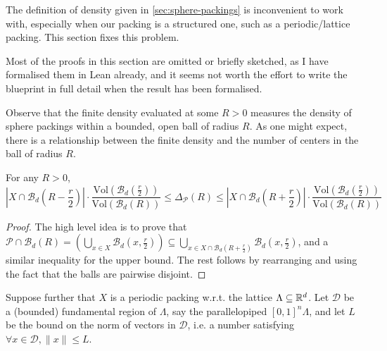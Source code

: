 The definition of density given in \cref{sec:sphere-packings} is inconvenient to work with, especially when our packing is a structured one, such as a periodic/lattice packing. This section fixes this problem.

Most of the proofs in this section are omitted or briefly sketched, as I have formalised them in Lean already, and it seems not worth the effort to write the blueprint in full detail when the result has been formalised.

Observe that the finite density evaluated at some $R > 0$ measures the density of sphere packings within a bounded, open ball of radius $R$. As one might expect, there is a relationship between the finite density and the number of centers in the ball of radius $R$.

\begin{lemma}\label{lemma:sp-finite-density-bound}\leanok
  For any $R > 0$,
  \[
    \left|X \cap \mathcal{B}_d\left(R - \frac{r}{2}\right)\right| \cdot \frac{\mathrm{Vol}\left(\mathcal{B}_d\left(\frac{r}{2}\right)\right)}{\mathrm{Vol}(\mathcal{B}_d(R))}
    \leq \Delta_{\mathcal{P}}(R)
    \leq \left|X \cap \mathcal{B}_d\left(R + \frac{r}{2}\right)\right| \cdot \frac{\mathrm{Vol}\left(\mathcal{B}_d\left(\frac{r}{2}\right)\right)}{\mathrm{Vol}(\mathcal{B}_d(R))}
  \]
\end{lemma}
\begin{proof}\leanok
  The high level idea is to prove that $\mathcal{P} \cap \mathcal{B}_d(R) = \left(\bigcup_{x \in X} \mathcal{B}_d\left(x, \frac{r}{2}\right)\right) \subseteq \bigcup_{x \in X \cap \mathcal{B}_d\left(R + \frac{r}{2}\right)} \mathcal{B}_d\left(x, \frac{r}{2}\right)$, and a similar inequality for the upper bound. The rest follows by rearranging and using the fact that the balls are pairwise disjoint.
\end{proof}

Suppose further that $X$ is a periodic packing w.r.t. the lattice $\Lambda \subseteq \mathbb{R}^d$. Let $\mathcal{D}$ be a (bounded) fundamental region of $\Lambda$, say the parallelopiped $[0, 1]^n\Lambda$, and let $L$ be the bound on the norm of vectors in $\mathcal{D}$, i.e. a number satisfying $\forall x \in \mathcal{D}, \|x\| \leq L$.

